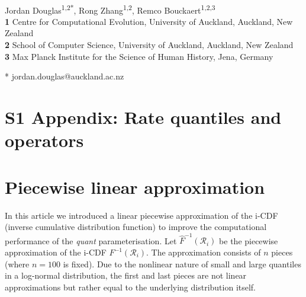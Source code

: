 \documentclass[12pt]{article}
\begin{document}
\vspace*{0.2in}

\begin{flushleft}
{\Large
\textbf{} %
}
\newline
\\
Jordan Douglas\textsuperscript{1,2*},
Rong Zhang\textsuperscript{1,2},
Remco Bouckaert\textsuperscript{1,2,3}
\\
\bigskip
\textbf{1} Centre for Computational Evolution,  University of Auckland, Auckland, New Zealand\\
\textbf{2} School of Computer Science, University of Auckland, Auckland, New Zealand\\
\textbf{3} Max Planck Institute for the Science of Human History, Jena, Germany\\
\bigskip


* jordan.douglas@auckland.ac.nz


\end{flushleft}




\section*{S1 Appendix: Rate quantiles and operators }



\section{Piecewise linear approximation}

In this article we introduced a linear piecewise approximation of the i-CDF (inverse cumulative distribution function) to improve the computational performance of the \textit{quant} parameterisation. 
Let $\hat{F}^{-1}(\mathcal{R}_i)$ be the piecewise approximation of the i-CDF $F^{-1}(\mathcal{R}_i)$. 
The approximation consists of $n$ pieces (where $n=100$ is fixed).
Due to the nonlinear nature of small and large quantiles in a log-normal distribution, the first and last pieces are not linear approximations but rather equal to the underlying distribution itself. 
\end{document}
